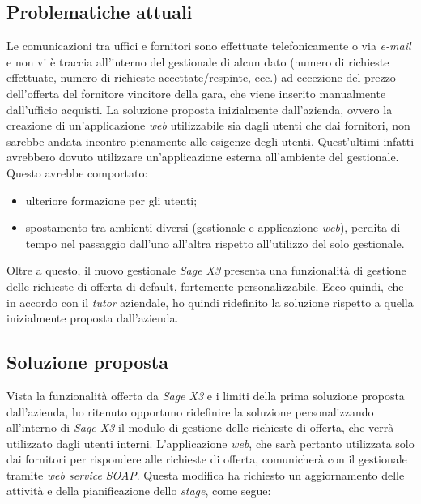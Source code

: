 \subsection{Problematiche attuali}
Le comunicazioni tra uffici e fornitori sono effettuate telefonicamente o via \textit{e-mail} e non vi è traccia all'interno del gestionale di alcun dato (numero di richieste effettuate, numero di richieste accettate/respinte, ecc.) ad eccezione del prezzo dell'offerta del fornitore vincitore della gara, che viene inserito manualmente dall'ufficio acquisti.
La soluzione proposta inizialmente dall'azienda, ovvero la creazione di un'applicazione \textit{web} utilizzabile sia dagli utenti che dai fornitori, non sarebbe andata incontro pienamente alle esigenze degli utenti. Quest'ultimi infatti avrebbero dovuto utilizzare un'applicazione esterna all'ambiente del gestionale. 
Questo avrebbe comportato:
\begin{itemize}
	\item ulteriore formazione per gli utenti;
	\item spostamento tra ambienti diversi (gestionale e applicazione \textit{web}), perdita di tempo nel passaggio dall'uno all'altra rispetto all'utilizzo del solo gestionale.
\end{itemize}
Oltre a questo, il nuovo gestionale \textit{Sage X3} presenta una funzionalità di gestione delle richieste di offerta di default, fortemente personalizzabile.
Ecco quindi, che in accordo con il \textit{tutor} aziendale, ho quindi ridefinito la soluzione rispetto a quella inizialmente proposta dall'azienda.

\subsection{Soluzione proposta}
Vista la funzionalità offerta da \textit{Sage X3} e i limiti della prima soluzione proposta dall'azienda, ho ritenuto opportuno ridefinire la soluzione personalizzando all'interno di \textit{Sage X3} il modulo di gestione delle richieste di offerta, che verrà utilizzato dagli utenti interni.
L'applicazione \textit{web}, che sarà pertanto utilizzata solo dai fornitori per rispondere alle richieste di offerta, comunicherà con il gestionale tramite \textit{web service} \textit{SOAP}.
Questa modifica ha richiesto un aggiornamento delle attività e della pianificazione dello \textit{stage}, come segue:


